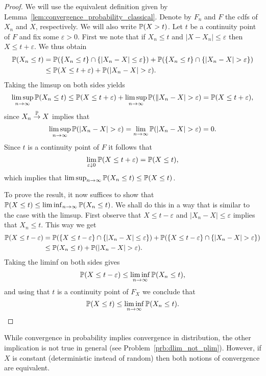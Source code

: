 \begin{proof}
We will use the equivalent definition given by Lemma~\ref{lem:convergence_probability_classical}. Denote by $F_n$ and $F$ the cdfs of $X_n$ and $X$, respectively. We will also write $\mathbb P(X > t)$. Let $t$ be a continuity point of $F$ and fix some $\varepsilon > 0$. First we note that if $X_n \le t$ and $|X-X_n|\le \varepsilon$ then $X \le t + \varepsilon$. We thus obtain
\begin{align*}
	\bbP(X_n \le t)
	&= \bbP(\{X_n \le t\} \cap \{|X_n - X| \le \varepsilon\}) + \bbP(\{X_n \le t\} \cap \{|X_n - X|>\varepsilon\})\\
	&\le \bbP(X \le t + \varepsilon) + \bbP(|X_n - X| > \varepsilon).
\end{align*}
Taking the limsup on both sides yields
\[
	\limsup_{n \to \infty} \mathbb P(X_n \le t)
	\le \mathbb P(X \le t + \varepsilon) + \limsup_{n \to \infty} \mathbb P(\|X_n - X| > \varepsilon)
	= \mathbb P(X \le t + \varepsilon),
\]
since $X_n \stackrel{\mathbb P}{\rightarrow} X$ implies that
\[
	\limsup_{n \to \infty} \mathbb P(|X_n - X| > \varepsilon)
	= \lim_{n \to \infty} \mathbb P(|X_n - X| > \varepsilon) = 0.
\]
Since $t$ is a continuity point of $F$ it follows that 
\[
	\lim_{\varepsilon \downarrow 0} \mathbb P(X \le t + \varepsilon) = \mathbb P(X \le t),
\]
which implies that $\limsup_{n \to \infty} \mathbb P(X_n \le t) \le \mathbb P(X \le t)$.

To prove the result, it now suffices to show that $\mathbb P(X \le t) \le \liminf_{n \to \infty} \mathbb P(X_n \le t)$.
We shall do this in a way that is similar to the case with the limsup. First observe that $X \le t - \varepsilon$ and $|X_n - X| \le \varepsilon$ implies that $X_n \le t$. This way we get
\begin{align*}
	\bbP(X \le t - \varepsilon)
	&= \bbP(\{X \le t - \varepsilon\} \cap \{|X_n -X|\le \varepsilon\}) + \bbP(\{X \le t - \varepsilon\} \cap \{|X_n - X|>\varepsilon\})\\
	&\le \bbP(X_n \le t) + \bbP(|X_n - X| > \varepsilon).
\end{align*}
Taking the liminf on both sides gives
\[
	\mathbb P(X \le t - \varepsilon)
	\le \liminf_{n \to \infty} \mathbb P(X_n \le t),
\]
and using that $t$ is a continuity point of $F_X$ we conclude that 
\[
	\mathbb P(X \le t) \le \liminf_{n \to \infty} \mathbb P(X_n \le t).\qedhere
\]
\end{proof}

While convergence in probability implies convergence in distribution, the other implication is not true in general (see Problem~\ref{prb:dlim_not_plim}). However, if $X$ is constant (deterministic instead of random) then both notions of convergence are equivalent.


